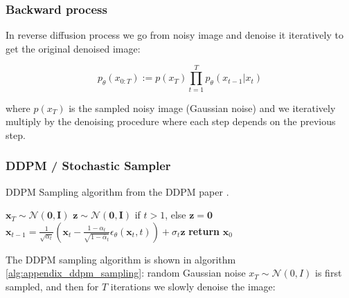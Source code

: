 \subsubsection*{Backward process}

In reverse diffusion process we go from noisy image and denoise it iteratively to get the original denoised image:

\[ p_\theta (x_{0:T}) := p(x_T) \prod_{t=1}^{T} p_\theta (x_{t-1} | x_t) \]

where $p(x_T)$ is the sampled noisy image (Gaussian noise) and we iteratively multiply by the denoising procedure where each step depends on the previous step.









\subsubsection{DDPM / Stochastic Sampler}





\begin{algorithm}
    \caption{DDPM Sampling algorithm from the DDPM paper \cite{ddpm}.}
    \label{alg:appendix_ddpm_sampling}
    \begin{algorithmic}[1]
        \State $\mathbf{x}_T \sim \mathcal{N}(\mathbf{0}, \mathbf{I})$
            \State $\mathbf{z} \sim \mathcal{N}(\mathbf{0}, \mathbf{I})$ if $t > 1$, else $\mathbf{z} = \mathbf{0}$
            \State $\mathbf{x}_{t-1} = \frac{1}{\sqrt{\alpha_t}} \left( \mathbf{x}_t - \frac{1 - \alpha_t}{\sqrt{1 - \bar{\alpha}_t}} {\epsilon}_{\theta} (\mathbf{x}_t, t) \right) + \sigma_t \mathbf{z}$
        \EndFor
        \State \textbf{return} $\mathbf{x}_0$
    \end{algorithmic}
\end{algorithm}






The DDPM sampling algorithm is shown in algorithm \ref{alg:appendix_ddpm_sampling}: random Gaussian noise $x_T \sim \mathcal{N} (0, I)$ is first sampled, and then for $T$ iterations we slowly denoise the image:

